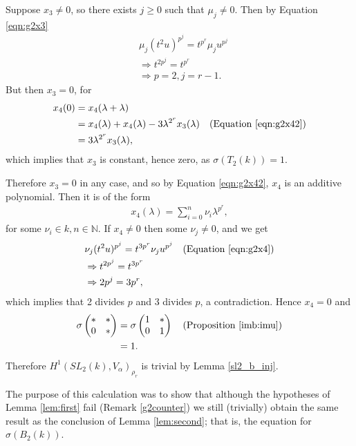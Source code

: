 	Suppose $x_3\neq 0$, so there exists $j\geq 0$ such that $\mu_j\neq 0$. Then by Equation \ref{eqn:g2x3}
	\begin{align*}
	&\mu_j (t^2u)^{p^j} = t^{p^r}\mu_j u^{p^j}\\
		&\Rightarrow t^{2p^j} = t^{p^r}\\
		&\Rightarrow p = 2, j = r-1.
		\end{align*}
		But then $x_3 = 0$, for
		\begin{align*}
		x_4(0) &= x_4(\lambda + \lambda) \\
							&= x_4(\lambda)+x_4(\lambda)-3\lambda^{2^r}x_3(\lambda)\quad(\textrm{Equation \ref{eqn:g2x42}}) \\
							&= 3\lambda^{2^r}x_3(\lambda),
		\end{align*}
		which implies that $x_3$ is constant, hence zero, as $\sigma(T_2(k)) = 1$.

		Therefore $x_3 = 0$ in any case, and so by Equation \ref{eqn:g2x42}, $x_4$ is an additive polynomial. Then it is of the form
		\begin{align*}
		x_4(\lambda) = \sum_{i=0}^n \nu_i \lambda^{p^r},
		\end{align*}
		for some $\nu_i \in k, n\in\mathbb{N}$.
		If $x_4\neq 0$ then some $\nu_j\neq 0$, and we get
		\begin{align*}
		&\nu_j(t^2u)^{p^j} = t^{3p^r}\nu_j u^{p^j}\quad(\textrm{Equation \ref{eqn:g2x4}})\\
			&\Rightarrow t^{2p^j} = t^{3p^r}\\
			&\Rightarrow 2p^j = 3p^r,
		\end{align*}
		which implies that 2 divides $p$ and 3 divides $p$, a contradiction. Hence $x_4=0$ and
		\begin{align*}
		\sigma\left(\begin{matrix}* & *\\0 & *\end{matrix}\right) &= \sigma\left(\begin{matrix}1 & *\\0 & 1\end{matrix}\right) \quad(\textrm{Proposition \ref{imb:imu}}) \\
			&= 1.
			\end{align*}
			Therefore $H^1(SL_2(k), V_\alpha)_{\rho_r}$ is trivial by Lemma \ref{sl2_b_inj}.

The purpose of this calculation was to show that although the hypotheses of Lemma \ref{lem:first} fail (Remark \ref{g2counter}) we still (trivially) obtain the same result as the conclusion of Lemma \ref{lem:second}; that is, the equation for $\sigma(B_2(k))$.

